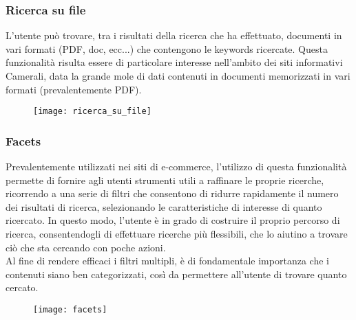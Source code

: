 			\subsubsection{Ricerca su file}
			L'utente può trovare, tra i risultati della ricerca che ha effettuato, documenti in vari formati (PDF, doc, ecc...) che contengono le keywords ricercate. Questa funzionalità risulta essere di particolare interesse nell'ambito dei siti informativi Camerali, data la grande mole di dati contenuti in documenti memorizzati in vari formati (prevalentemente PDF).
			
			\begin{figure}[htbp]
				\begin{center}
					\texttt{[image: ricerca\_su\_file]}
				\end{center}
			\end{figure}
		
			\subsubsection{Facets}
			Prevalentemente utilizzati nei siti di e-commerce, l'utilizzo di questa funzionalità permette di fornire agli utenti strumenti utili a raffinare le proprie ricerche, ricorrendo a una serie di filtri che consentono di ridurre rapidamente il numero dei risultati di ricerca, selezionando le caratteristiche di interesse di quanto ricercato. In questo modo, l'utente è in grado di costruire il proprio percorso di ricerca, consentendogli di effettuare ricerche più flessibili, che lo aiutino a trovare ciò che sta cercando con poche azioni. \\
			Al fine di rendere efficaci i filtri multipli, è di fondamentale importanza che i contenuti siano ben categorizzati, così da permettere all'utente di trovare quanto cercato.
			
			\begin{figure}[htbp]
				\begin{center}
					\texttt{[image: facets]}
				\end{center}
			\end{figure}
		
